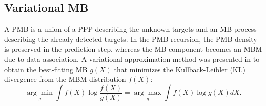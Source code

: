 

\subsection{Variational MB}
A PMB is a union of a PPP describing the unknown targets and an MB process describing the already detected targets. In the PMB recursion, the PMB density is preserved in the prediction step, whereas the MB component becomes an MBM due to data association. A variational approximation method was presented in \cite{variational} to obtain the best-fitting MB $g(X)$ that minimizes the Kullback-Leibler (KL) divergence from the MBM distribution $f(X)$:
\begin{equation}
\underset{g}{\arg\min}\int f(X)\log\frac{f(X)}{g(X)} = \underset{g}{\arg\max}\int f(X)\log g(X)dX.
\label{eq:kl}
\end{equation}


